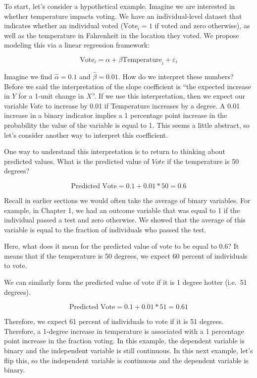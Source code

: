 \documentclass[
]{book}
\begin{document}
To start, let's consider a hypothetical example. Imagine we are interested in whether temperature impacts voting. We have an individual-level dataset that indicates whether an individual voted (\(\text{Vote}_i=1\) if voted and zero otherwise), as well as the temperature in Fahrenheit in the location they voted. We propose modeling this via a linear regression framework:

\[
\text{Vote}_i = \alpha + \beta \text{Temperature}_i + \varepsilon_i
\]

Imagine we find \(\hat{\alpha}=0.1\) and \(\hat{\beta}=0.01\). How do we interpret these numbers? Before we said the interpretation of the slope coefficient is ``the expected increase in \(Y\) for a 1-unit change in \(X\)''. If we use this interpretation, then we expect our variable \(Vote\) to increase by 0.01 if Temperature increases by a degree. A 0.01 increase in a binary indicator implies a 1 percentage point increase in the probability the value of the variable is equal to 1. This seems a little abstract, so let's consider another way to interpret this coefficient.

One way to understand this interpretation is to return to thinking about predicted values. What is the predicted value of \(Vote\) if the temperature is 50 degrees?

\[
\text{Predicted Vote} = 0.1 + 0.01*50 = 0.6
\]

Recall in earlier sections we would often take the average of binary variables. For example, in Chapter 1, we had an outcome variable that was equal to 1 if the individual passed a test and zero otherwise. We showed that the average of this variable is equal to the fraction of individuals who passed the test.

Here, what does it mean for the predicted value of vote to be equal to 0.6? It means that if the temperature is 50 degrees, we expect 60 percent of individuals to vote.

We can similarly form the predicted value of vote if it is 1 degree hotter (i.e.~51 degrees).

\[
\text{Predicted Vote} = 0.1 + 0.01*51 = 0.61
\]

Therefore, we expect 61 percent of individuals to vote if it is 51 degrees. Therefore, a 1-degree increase in temperature is associated with a 1 percentage point increase in the fraction voting. In this example, the dependent variable is binary and the independent variable is still continuous. In this next example, let's flip this, so the independent variable is continuous and the dependent variable is binary.
\end{document}

